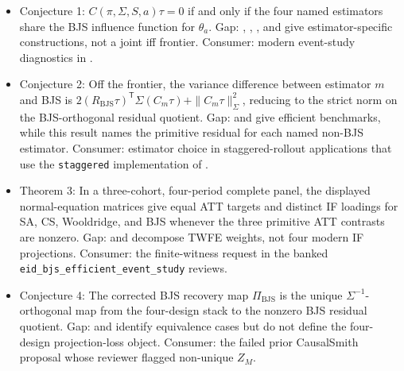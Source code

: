 \documentclass[11pt]{article}
\newcommand{\transpose}{\mathsf{T}}
\theoremstyle{definition}
\theoremstyle{plain}
\theoremstyle{remark}
\begin{document}
\begin{itemize}[leftmargin=*]
\item Conjecture 1: \(C(\pi,\Sigma,S,a)\tau=0\) if and only if the four named estimators share the BJS influence function for \(\theta_a\). Gap: \citet[Section 2.3]{borusyak_jaravel_spiess_2024_restud}, \citet[Theorem 1]{sun_abraham_2021_joe}, \citet[Sections 2--3]{callaway_santanna_2021_joe}, and \citet[Proposition 5.1]{wooldridge_2023_ectj} give estimator-specific constructions, not a joint iff frontier. Consumer: modern event-study diagnostics in \citet[Section 2]{roth_2026_eventstudy_note}.
\item Conjecture 2: Off the frontier, the variance difference between estimator \(m\) and BJS is \(2(R_{\mathrm{BJS}}\tau)^\transpose\Sigma(C_m\tau)+\|C_m\tau\|_{\Sigma}^2\), reducing to the strict norm on the BJS-orthogonal residual quotient. Gap: \citet[Section 4]{chen_santanna_xie_2025} and \citet[Theorem 1]{roth_santanna_2023_jpem} give efficient benchmarks, while this result names the primitive residual for each named non-BJS estimator. Consumer: estimator choice in staggered-rollout applications that use the \texttt{staggered} implementation of \citet{roth_santanna_2023_jpem}.
\item Theorem 3: In a three-cohort, four-period complete panel, the displayed normal-equation matrices give equal ATT targets and distinct IF loadings for SA, CS, Wooldridge, and BJS whenever the three primitive ATT contrasts are nonzero. Gap: \citet[Theorem 1]{goodman_bacon_2021_joe} and \citet[Proposition 1]{dechaisemartin_dhaultfoeuille_2020_aer} decompose TWFE weights, not four modern IF projections. Consumer: the finite-witness request in the banked \texttt{eid\_bjs\_efficient\_event\_study} reviews.
\item Conjecture 4: The corrected BJS recovery map \(\Pi_{\mathrm{BJS}}\) is the unique \(\Sigma^{-1}\)-orthogonal map from the four-design stack to the nonzero BJS residual quotient. Gap: \citet[Proposition 5.1]{wooldridge_2023_ectj} and \citet[Section 2.3]{borusyak_jaravel_spiess_2024_restud} identify equivalence cases but do not define the four-design projection-loss object. Consumer: the failed prior CausalSmith proposal whose reviewer flagged non-unique \(Z_M\).
\end{itemize}
\end{document}
